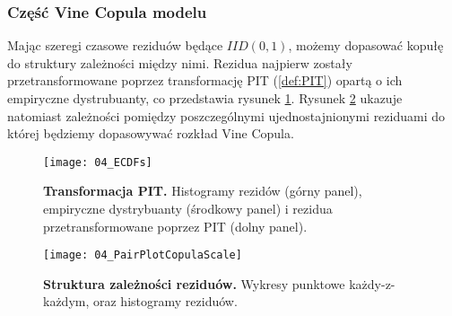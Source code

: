 \FloatBarrier
\subsubsection{Część Vine Copula modelu}

Mając szeregi czasowe reziduów będące $IID(0,1)$, możemy dopasować kopułę do struktury zależności między nimi. Rezidua najpierw zostały przetransformowane poprzez transformację PIT (\ref{def:PIT}) opartą o ich empiryczne dystrubuanty, co przedstawia rysunek \ref{fig:ecdf_pit}. Rysunek \ref{fig:pair_copulas} ukazuje natomiast zależności pomiędzy poszczególnymi ujednostajnionymi reziduami do której będziemy dopasowywać rozkład Vine Copula.

\begin{figure}[h]
	\centering
	\texttt{[image: 04\_ECDFs]}
	\caption{\textbf{Transformacja PIT.} Histogramy rezidów (górny panel), empiryczne dystrybuanty (środkowy panel) i rezidua przetransformowane poprzez PIT (dolny panel). \label{fig:ecdf_pit}}
\end{figure}

\begin{figure}[h]
	\centering
	\texttt{[image: 04\_PairPlotCopulaScale]}
	\caption{\textbf{Struktura zależności reziduów.} Wykresy punktowe każdy-z-każdym, oraz histogramy reziduów. \label{fig:pair_copulas}}
\end{figure}

